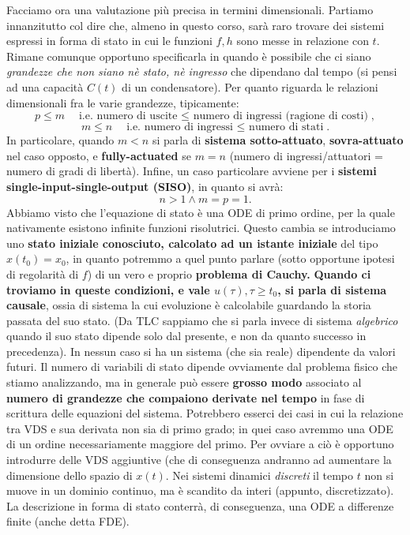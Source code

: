 \documentclass[a4paper]{report}
\begin{document}
Facciamo ora una valutazione più precisa in termini dimensionali. Partiamo innanzitutto col dire che, almeno in questo corso, sarà raro trovare dei sistemi espressi in forma di stato in cui le funzioni $f,h$ sono messe in relazione con $t$. Rimane comunque opportuno specificarla in quando è possibile che ci siano \textit{grandezze che non siano nè stato, nè ingresso} che dipendano dal tempo (si pensi ad una capacità $C(t)$ di un condensatore). Per quanto riguarda le relazioni dimensionali fra le varie grandezze, tipicamente:
\begin{equation*}
	\boxed{p \leq m} \quad \textrm{i.e. numero di uscite $\leq$ numero di ingressi (ragione di costi)},
\end{equation*}
\begin{equation*}
	\boxed{m \leq n} \quad \textrm{i.e. numero di ingressi $\leq$ numero di stati}.
\end{equation*}
In particolare, quando $m < n$ si parla di \textbf{sistema sotto-attuato}, \textbf{sovra-attuato} nel caso opposto, e \textbf{fully-actuated} se $m=n$ (numero di ingressi/attuatori = numero di gradi di libertà). Infine, un caso particolare avviene per i \textbf{sistemi single-input-single-output (SISO)}, in quanto si avrà:
\begin{equation*}
	n>1 \wedge m=p=1.
\end{equation*}
\bb
Abbiamo visto che l'equazione di stato è una ODE di primo ordine, per la quale nativamente esistono infinite funzioni risolutrici. Questo cambia se introduciamo uno \textbf{stato iniziale conosciuto, calcolato ad un istante iniziale} del tipo $x(t_0)=x_0$, in quanto potremmo a quel punto parlare (sotto opportune ipotesi di regolarità di $f$) di un vero e proprio \textbf{problema di Cauchy.} \textbf{Quando ci troviamo in queste condizioni, e vale $u(\tau), \tau \geq t_0$, si parla di sistema causale}, ossia di sistema la cui evoluzione è calcolabile guardando la storia passata del suo stato. (Da TLC sappiamo che si parla invece di sistema \textit{algebrico} quando il suo stato dipende solo dal presente, e non da quanto successo in precedenza). In nessun caso si ha un sistema (che sia reale) dipendente da valori futuri.
\bb
Il numero di variabili di stato dipende ovviamente dal problema fisico che stiamo analizzando, ma in generale può essere \textbf{grosso modo} associato al \textbf{numero di grandezze che compaiono derivate nel tempo} in fase di scrittura delle equazioni del sistema. Potrebbero esserci dei casi in cui la relazione tra VDS e sua derivata non sia di primo grado; in quei caso avremmo una ODE di un ordine necessariamente maggiore del primo. Per ovviare a ciò è opportuno introdurre delle VDS aggiuntive (che di conseguenza andranno ad aumentare la dimensione dello spazio di $x(t)$.
\bb
Nei sistemi dinamici \textit{discreti}  il tempo $t$ non si muove in un dominio continuo, ma è scandito da interi (appunto, discretizzato). La descrizione in forma di stato conterrà, di conseguenza, una ODE a differenze finite (anche detta FDE).
\end{document}
